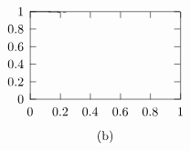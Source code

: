 \documentclass[a4paper,a4paper]{article}
\begin{document}
\begin{figure}[tbh]
\[%
\setlength{\unitlength}{0.240900pt} \ifx\plotpoint\undefined%
\newsavebox{\plotpoint}\fi
\begin{picture}(629,450)(0,0)
\font\gnuplot=cmr10 at 10pt
\gnuplot
\sbox{\plotpoint}{\rule[-0.200pt]{0.400pt}{0.400pt}}%
\put(120.0,123.0){\rule[-0.200pt]{4.818pt}{0.400pt}}
\put(100,123){\makebox(0,0)[r]{0}}
\put(588.0,123.0){\rule[-0.200pt]{4.818pt}{0.400pt}}
\put(120.0,180.0){\rule[-0.200pt]{4.818pt}{0.400pt}}
\put(100,180){\makebox(0,0)[r]{0.2}}
\put(588.0,180.0){\rule[-0.200pt]{4.818pt}{0.400pt}}
\put(120.0,238.0){\rule[-0.200pt]{4.818pt}{0.400pt}}
\put(100,238){\makebox(0,0)[r]{0.4}}
\put(588.0,238.0){\rule[-0.200pt]{4.818pt}{0.400pt}}
\put(120.0,295.0){\rule[-0.200pt]{4.818pt}{0.400pt}}
\put(100,295){\makebox(0,0)[r]{0.6}}
\put(588.0,295.0){\rule[-0.200pt]{4.818pt}{0.400pt}}
\put(120.0,353.0){\rule[-0.200pt]{4.818pt}{0.400pt}}
\put(100,353){\makebox(0,0)[r]{0.8}}
\put(588.0,353.0){\rule[-0.200pt]{4.818pt}{0.400pt}}
\put(120.0,410.0){\rule[-0.200pt]{4.818pt}{0.400pt}}
\put(100,410){\makebox(0,0)[r]{1}}
\put(588.0,410.0){\rule[-0.200pt]{4.818pt}{0.400pt}}
\put(120.0,123.0){\rule[-0.200pt]{0.400pt}{4.818pt}}
\put(120,82){\makebox(0,0){0}}
\put(120.0,390.0){\rule[-0.200pt]{0.400pt}{4.818pt}}
\put(218.0,123.0){\rule[-0.200pt]{0.400pt}{4.818pt}}
\put(218,82){\makebox(0,0){0.2}}
\put(218.0,390.0){\rule[-0.200pt]{0.400pt}{4.818pt}}
\put(315.0,123.0){\rule[-0.200pt]{0.400pt}{4.818pt}}
\put(315,82){\makebox(0,0){0.4}}
\put(315.0,390.0){\rule[-0.200pt]{0.400pt}{4.818pt}}
\put(413.0,123.0){\rule[-0.200pt]{0.400pt}{4.818pt}}
\put(413,82){\makebox(0,0){0.6}}
\put(413.0,390.0){\rule[-0.200pt]{0.400pt}{4.818pt}}
\put(510.0,123.0){\rule[-0.200pt]{0.400pt}{4.818pt}}
\put(510,82){\makebox(0,0){0.8}}
\put(510.0,390.0){\rule[-0.200pt]{0.400pt}{4.818pt}}
\put(608.0,123.0){\rule[-0.200pt]{0.400pt}{4.818pt}}
\put(608,82){\makebox(0,0){1}}
\put(608.0,390.0){\rule[-0.200pt]{0.400pt}{4.818pt}}
\put(120.0,123.0){\rule[-0.200pt]{117.559pt}{0.400pt}}
\put(608.0,123.0){\rule[-0.200pt]{0.400pt}{69.138pt}}
\put(120.0,410.0){\rule[-0.200pt]{117.559pt}{0.400pt}}
\put(364,0){\makebox(0,0){(b)}}
\put(120.0,123.0){\rule[-0.200pt]{0.400pt}{69.138pt}}
\put(120,410){\usebox{\plotpoint}}
\put(179,408.67){\rule{2.168pt}{0.400pt}}
\multiput(179.00,409.17)(4.500,-1.000){2}{\rule{1.084pt}{0.400pt}}
\put(120.0,410.0){\rule[-0.200pt]{14.213pt}{0.400pt}}
\put(208,407.67){\rule{2.409pt}{0.400pt}}
\multiput(208.00,408.17)(5.000,-1.000){2}{\rule{1.204pt}{0.400pt}}
\put(188.0,409.0){\rule[-0.200pt]{4.818pt}{0.400pt}}
\put(227,406.67){\rule{2.409pt}{0.400pt}}

\end{picture}\]
\end{figure}
\end{document}
